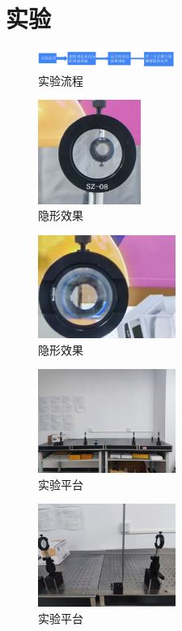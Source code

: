 \documentclass[UTF8]{gapd}
\begin{document}
\section{实验}
\label{sec:Experiment}
\begin{figure}[htbp]
  \centering
  \includegraphics[width=0.4\textwidth]{images/18.jpg}
  \caption{实验流程}
  \label{fig:18}
\end{figure}
\begin{figure}[htbp]
  \centering
  \includegraphics[width=0.3\textwidth]{images/19.jpg}
  \caption{隐形效果}
  \label{fig:19}
\end{figure}
\begin{figure}[htbp]
  \centering
  \includegraphics[width=0.4\textwidth]{images/20.jpg}
  \caption{隐形效果}
  \label{fig:20}
\end{figure}
\begin{figure}[H]
  \centering
  \includegraphics[width=0.4\textwidth]{images/21.jpg}
  \caption{实验平台}
  \label{fig:21}
\end{figure}
\begin{figure}[H]
  \centering
  \includegraphics[width=0.4\textwidth]{images/22.jpg}
  \caption{实验平台}
  \label{fig:22}
\end{figure}
\end{document}
